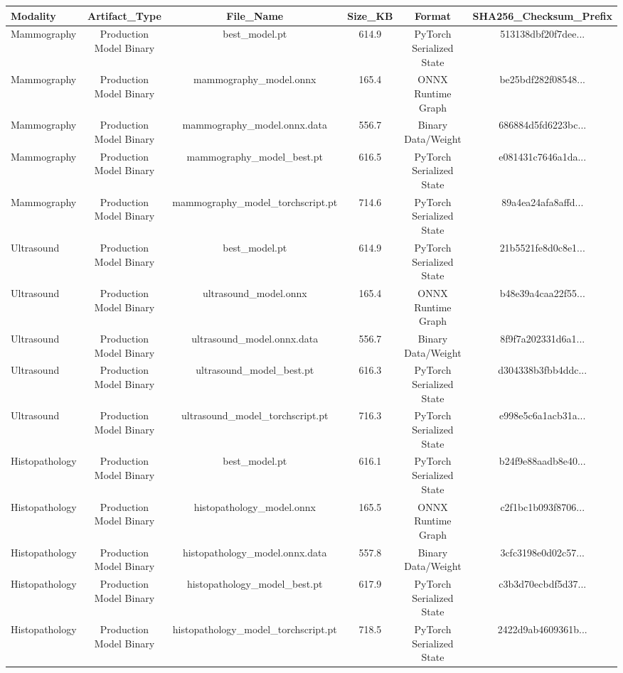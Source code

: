 \begin{table}[htbp]
\centering
\small
\begin{tabular}{lccccc}
\hline
Modality & Artifact\_Type & File\_Name & Size\_KB & Format & SHA256\_Checksum\_Prefix \\
\hline
Mammography & Production Model Binary & best\_model.pt & 614.9 & PyTorch Serialized State & 513138dbf20f7dee... \\
Mammography & Production Model Binary & mammography\_model.onnx & 165.4 & ONNX Runtime Graph & be25bdf282f08548... \\
Mammography & Production Model Binary & mammography\_model.onnx.data & 556.7 & Binary Data/Weight & 686884d5fd6223bc... \\
Mammography & Production Model Binary & mammography\_model\_best.pt & 616.5 & PyTorch Serialized State & e081431c7646a1da... \\
Mammography & Production Model Binary & mammography\_model\_torchscript.pt & 714.6 & PyTorch Serialized State & 89a4ea24afa8affd... \\
Ultrasound & Production Model Binary & best\_model.pt & 614.9 & PyTorch Serialized State & 21b5521fe8d0c8e1... \\
Ultrasound & Production Model Binary & ultrasound\_model.onnx & 165.4 & ONNX Runtime Graph & b48e39a4caa22f55... \\
Ultrasound & Production Model Binary & ultrasound\_model.onnx.data & 556.7 & Binary Data/Weight & 8f9f7a202331d6a1... \\
Ultrasound & Production Model Binary & ultrasound\_model\_best.pt & 616.3 & PyTorch Serialized State & d304338b3fbb4ddc... \\
Ultrasound & Production Model Binary & ultrasound\_model\_torchscript.pt & 716.3 & PyTorch Serialized State & e998e5c6a1acb31a... \\
Histopathology & Production Model Binary & best\_model.pt & 616.1 & PyTorch Serialized State & b24f9e88aadb8e40... \\
Histopathology & Production Model Binary & histopathology\_model.onnx & 165.5 & ONNX Runtime Graph & c2f1bc1b093f8706... \\
Histopathology & Production Model Binary & histopathology\_model.onnx.data & 557.8 & Binary Data/Weight & 3cfc3198e0d02c57... \\
Histopathology & Production Model Binary & histopathology\_model\_best.pt & 617.9 & PyTorch Serialized State & c3b3d70ecbdf5d37... \\
Histopathology & Production Model Binary & histopathology\_model\_torchscript.pt & 718.5 & PyTorch Serialized State & 2422d9ab4609361b... \\

\end{tabular}
\end{table}
